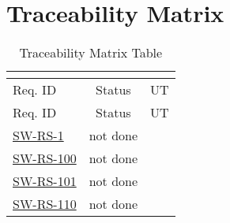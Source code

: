 


\chapter{Traceability Matrix}


\begin{longtable}{l c  c }
\caption{Traceability Matrix Table} \\
\label{tbl:tracematrix} \\
\toprule
Req. ID  & Status 
 & UT  \\
\midrule
\endfirsthead
\toprule
Req. ID  & Status 
 & UT  \\
\midrule
\endhead
\bottomrule
\endfoot
\bottomrule
\endlastfoot


\hyperref[SW-RS-1]{SW-RS-1} \label{trmat:SW-RS-1} & %
not done %
 &   %
 \\

\hyperref[SW-RS-100]{SW-RS-100} \label{trmat:SW-RS-100} & %
not done %
 &   %
 \\

\hyperref[SW-RS-101]{SW-RS-101} \label{trmat:SW-RS-101} & %
not done %
 &   %
 \\

\hyperref[SW-RS-110]{SW-RS-110} \label{trmat:SW-RS-110} & %
not done %
 &   %
 \\

\end{longtable}
